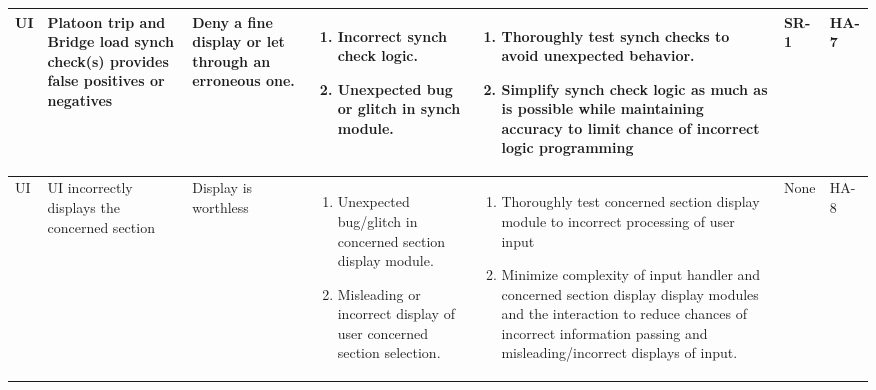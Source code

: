 \documentclass{article}
\begin{document}
\begin{landscape}
\begin{longtable}{|p{} | p{} | p{} | p{} | p{} | p{} | p{}|}
  UI & Platoon trip and Bridge load synch check(s) provides false positives or negatives & 
  Deny a fine display or let through an erroneous one. & 
  \begin{enumerate}[leftmargin=*, label={\alph*.}, itemsep=1pt, topsep=0pt, partopsep=0pt] 
    \item Incorrect synch check logic.
    \item Unexpected bug or glitch in synch module.
  \end{enumerate} & 
  \begin{enumerate}[leftmargin=*, label={\alph*.}, itemsep=1pt, topsep=0pt, partopsep=0pt] 
    \item Thoroughly test synch checks to avoid unexpected behavior.
    \item Simplify synch check logic as much as is possible while maintaining accuracy to limit chance of incorrect logic programming
  \end{enumerate} &
  SR-1 & HA-7 \\

  \hline
  
  UI & UI incorrectly displays the concerned section& Display is worthless & 
  \begin{enumerate}[leftmargin=*, label={\alph*.}, itemsep=1pt, topsep=0pt, partopsep=0pt] 
    \item Unexpected bug/glitch in concerned section display module.
    \item Misleading or incorrect display of user concerned section selection.
  \end{enumerate} &
  \begin{enumerate}[leftmargin=*, label={\alph*.}, itemsep=1pt, topsep=0pt, partopsep=0pt] 
    \item Thoroughly test concerned section display module to incorrect processing of user input
    \item Minimize complexity of input handler and concerned section display display modules and the interaction to 
    reduce chances of incorrect information passing and misleading/incorrect displays of input.
  \end{enumerate} &
  None & HA-8 \\

  \hline
  

\end{longtable}
\end{landscape}
\end{document}
